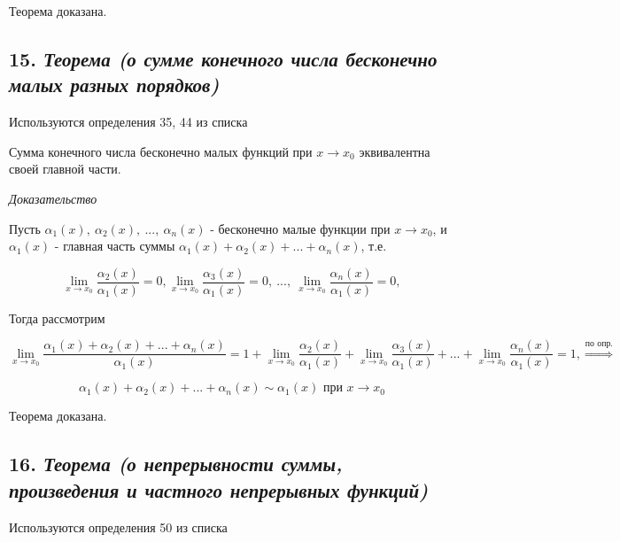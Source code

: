 Теорема доказана.
\newpage 
\subsection*{15. \textit{Теорема (о сумме конечного числа бесконечно малых разных порядков)}}
\begin{Quote2} 
\small\centering 

Используются определения 35, 44 из списка \end{Quote2} 

Сумма конечного числа бесконечно малых функций при $x \rightarrow x_0$ эквивалентна своей главной части.
\vspace*{20pt} 

\textit{Доказательство}

Пусть $\alpha_1(x), \ \alpha_2(x), \ ..., \ \alpha_n(x)$ - бесконечно малые функции при $x \rightarrow x_0$, и $\alpha_1(x)$ - главная часть суммы $\alpha_1(x) + \alpha_2(x) + ... +  \alpha_n(x)$, т.е.

$$
\lim\limits_{x \to x_0}\dfrac{\alpha_2(x)}{\alpha_1(x)} = 0, \lim\limits_{x \to x_0}\dfrac{\alpha_3(x)}{\alpha_1(x)} = 0, \ ...,\ \lim\limits_{x \to x_0}\dfrac{\alpha_n(x)}{\alpha_1(x)} = 0, 
$$

Тогда рассмотрим

$$
\lim\limits_{x \to x_0}{\dfrac{\alpha_1(x) + \alpha_2(x) + ... +  \alpha_n(x)}{\alpha_1(x)}}= 1 + \lim\limits_{x \to x_0}\dfrac{\alpha_2(x)}{\alpha_1(x)} + \lim\limits_{x \to x_0}\dfrac{\alpha_3(x)}{\alpha_1(x)}+ ... + \lim\limits_{x \to x_0}\dfrac{\alpha_n(x)}{\alpha_1(x)} = 1, \overset{\text{по опр.}}\Rightarrow
$$

$$
\alpha_1(x) + \alpha_2(x) + ... +  \alpha_n(x) \sim \alpha_1(x) \text{ при } x \rightarrow x_0
$$

Теорема доказана.
\newpage 
\subsection*{16. \textit{Теорема (о непрерывности суммы, произведения и частного непрерывных функций)}}
\begin{Quote2} 
\small\centering 

Используются определения 50 из списка \end{Quote2} 

